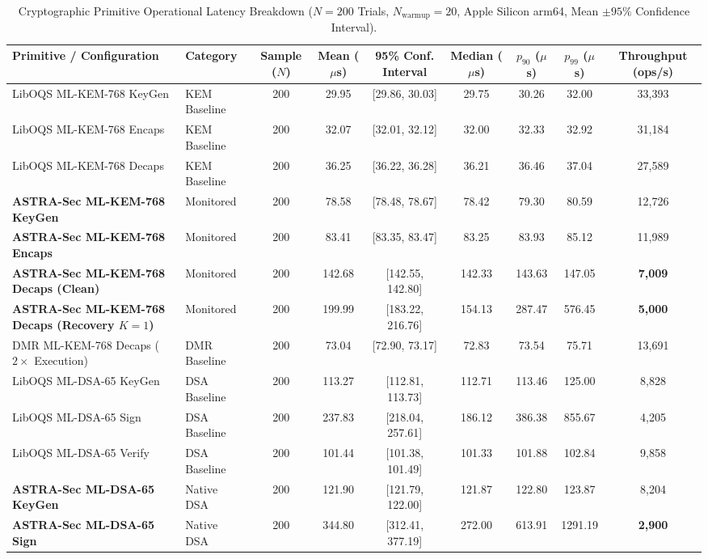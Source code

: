 \begin{table}[t]
\centering
\caption{Cryptographic Primitive Operational Latency Breakdown ($N=200$ Trials, $N_{\text{warmup}}=20$, Apple Silicon arm64, Mean $\pm 95\%$ Confidence Interval).}
\label{tab:crypto_latencies}
\small
\begin{tabular}{llccccccc}
\hline
\textbf{Primitive / Configuration} & \textbf{Category} & \textbf{Sample ($N$)} & \textbf{Mean ($\mu$s)} & \textbf{95\% Conf. Interval} & \textbf{Median ($\mu$s)} & \textbf{$p_{90}$ ($\mu$s)} & \textbf{$p_{99}$ ($\mu$s)} & \textbf{Throughput (ops/s)} \\
\hline
LibOQS ML-KEM-768 KeyGen & KEM Baseline & 200 & 29.95 & [29.86, 30.03] & 29.75 & 30.26 & 32.00 & 33,393 \\
LibOQS ML-KEM-768 Encaps & KEM Baseline & 200 & 32.07 & [32.01, 32.12] & 32.00 & 32.33 & 32.92 & 31,184 \\
LibOQS ML-KEM-768 Decaps & KEM Baseline & 200 & 36.25 & [36.22, 36.28] & 36.21 & 36.46 & 37.04 & 27,589 \\
\hline
\textbf{ASTRA-Sec ML-KEM-768 KeyGen} & Monitored & 200 & 78.58 & [78.48, 78.67] & 78.42 & 79.30 & 80.59 & 12,726 \\
\textbf{ASTRA-Sec ML-KEM-768 Encaps} & Monitored & 200 & 83.41 & [83.35, 83.47] & 83.25 & 83.93 & 85.12 & 11,989 \\
\textbf{ASTRA-Sec ML-KEM-768 Decaps (Clean)} & Monitored & 200 & 142.68 & [142.55, 142.80] & 142.33 & 143.63 & 147.05 & \textbf{7,009} \\
\textbf{ASTRA-Sec ML-KEM-768 Decaps (Recovery $K=1$)} & Monitored & 200 & 199.99 & [183.22, 216.76] & 154.13 & 287.47 & 576.45 & \textbf{5,000} \\
DMR ML-KEM-768 Decaps ($2\times$ Execution) & DMR Baseline & 200 & 73.04 & [72.90, 73.17] & 72.83 & 73.54 & 75.71 & 13,691 \\
\hline
LibOQS ML-DSA-65 KeyGen & DSA Baseline & 200 & 113.27 & [112.81, 113.73] & 112.71 & 113.46 & 125.00 & 8,828 \\
LibOQS ML-DSA-65 Sign & DSA Baseline & 200 & 237.83 & [218.04, 257.61] & 186.12 & 386.38 & 855.67 & 4,205 \\
LibOQS ML-DSA-65 Verify & DSA Baseline & 200 & 101.44 & [101.38, 101.49] & 101.33 & 101.88 & 102.84 & 9,858 \\
\textbf{ASTRA-Sec ML-DSA-65 KeyGen} & Native DSA & 200 & 121.90 & [121.79, 122.00] & 121.87 & 122.80 & 123.87 & 8,204 \\
\textbf{ASTRA-Sec ML-DSA-65 Sign} & Native DSA & 200 & 344.80 & [312.41, 377.19] & 272.00 & 613.91 & 1291.19 & \textbf{2,900} \\

\end{tabular}
\end{table}

